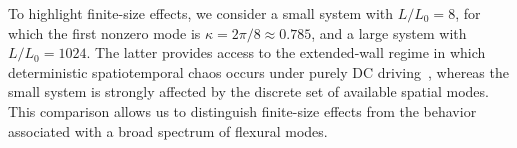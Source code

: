 \documentclass[prb,aps,twocolumn,superscriptaddress,floatfix]{revtex4-1}
\newcommand{\aleadd}[1]{{\color{blue}#1}}
\newcommand{\alecom}[1]{{\color{red}#1}}
\begin{document}
%

\aleadd{
To highlight finite-size effects, we consider a small system with $L/L_0=8$, for which the first nonzero mode is $\kappa=2\pi/8\approx 0.785$, and a large system with $L/L_0=1024$. The latter provides access to the extended-wall regime in which deterministic spatiotemporal chaos occurs under purely DC driving~\cite{pusiol2026deterministic}, whereas the small system is strongly affected by the discrete set of available spatial modes. This comparison allows us to distinguish finite-size effects from the behavior associated with a broad spectrum of flexural modes.
}


\end{document}
